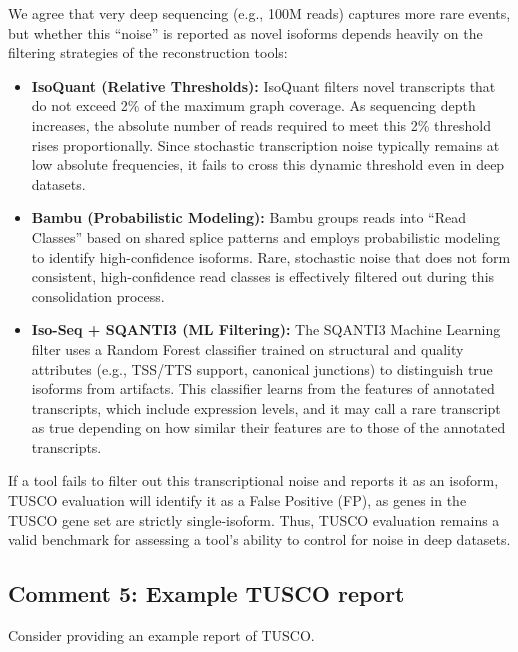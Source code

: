 \documentclass[11pt]{article}
\begin{document}
\begin{responseboxnew}
We agree that very deep sequencing (e.g., 100M reads) captures more rare events, but whether this ``noise'' is reported as novel isoforms depends heavily on the filtering strategies of the reconstruction tools:
\begin{itemize}
    \item \textbf{IsoQuant (Relative Thresholds):} IsoQuant filters novel transcripts that do not exceed 2\% of the maximum graph coverage. As sequencing depth increases, the absolute number of reads required to meet this 2\% threshold rises proportionally. Since stochastic transcription noise typically remains at low absolute frequencies, it fails to cross this dynamic threshold even in deep datasets.
    \item \textbf{Bambu (Probabilistic Modeling):} Bambu groups reads into ``Read Classes'' based on shared splice patterns and employs probabilistic modeling to identify high-confidence isoforms. Rare, stochastic noise that does not form consistent, high-confidence read classes is effectively filtered out during this consolidation process.
    \item \textbf{Iso-Seq + SQANTI3 (ML Filtering):} The SQANTI3 Machine Learning filter uses a Random Forest classifier trained on structural and quality attributes (e.g., TSS/TTS support, canonical junctions) to distinguish true isoforms from artifacts. This classifier learns from the features of annotated transcripts, which include expression levels, and it may call a rare transcript as true depending on how similar their features are to those of the annotated transcripts.
\end{itemize}

\vspace{0.3cm}
If a tool fails to filter out this transcriptional noise and reports it as an isoform, TUSCO evaluation will identify it as a False Positive (FP), as genes in the TUSCO gene set are strictly single-isoform. Thus, TUSCO evaluation remains a valid benchmark for assessing a tool's ability to control for noise in deep datasets.
\end{responseboxnew}

\subsection{Comment 5: Example TUSCO report}

\begin{reviewercomment}
Consider providing an example report of TUSCO.
\end{reviewercomment}
\end{document}
